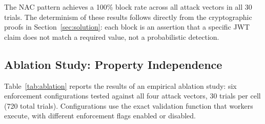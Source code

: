 \documentclass[journal]{IEEEtran}
\begin{document}
The NAC pattern achieves a 100\% block rate across all attack vectors in all
30 trials. The determinism of these results follows directly from the
cryptographic proofs in Section~\ref{sec:solution}: each block is an assertion
that a specific JWT claim does not match a required value, not a probabilistic
detection.

\subsection{Ablation Study: Property Independence}
\label{sec:ablation}

Table~\ref{tab:ablation} reports the results of an empirical ablation study:
six enforcement configurations tested against all four attack vectors, 30 trials
per cell (720 total trials). Configurations use the exact validation function
that workers execute, with different enforcement flags enabled or disabled.

\begin{table}[h]
\caption{Ablation study: property independence ($N=30$ per cell; 720 trials total)}
\label{tab:ablation}
\centering
\footnotesize
\setlength{\tabcolsep}{3pt}
\end{table}
\end{document}
